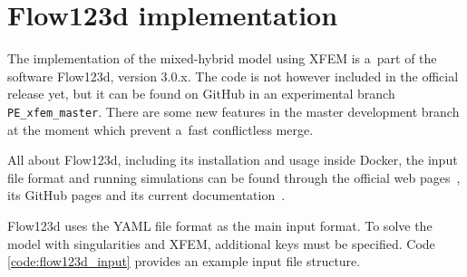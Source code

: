 

\section{Flow123d implementation}

The implementation of the mixed-hybrid model using XFEM is a~part of the software Flow123d, version 3.0.x.
The code is not however included in the official release yet, but it can be found on GitHub in an experimental branch \verb'PE_xfem_master'.
There are some new features in the master development branch at the moment which prevent a~fast conflictless merge.

All about Flow123d, including its installation and usage inside Docker, the input file format and running simulations
can be found through the official web pages~\cite{flow123d}, its GitHub pages and its current documentation~\cite{flow123d_doc_2018}.

Flow123d uses the YAML file format as the main input format. To solve the model with singularities and XFEM, additional
keys must be specified. Code \ref{code:flow123d_input} provides an example input file structure. 

